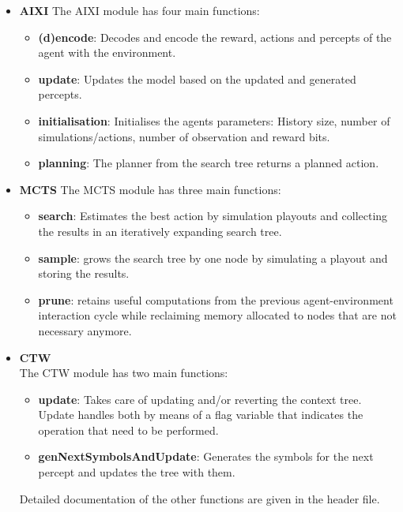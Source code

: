 \documentclass{article}
\theoremstyle{definition}
\newtheorem{primary statistics}[definition]{Primary Statistics}
\newtheorem{auxiliary statistics}[definition]{Auxiliary Statistics}
\begin{document}

\begin{itemize}
    \item \textbf{AIXI} The AIXI module has four main functions: 
    \begin{itemize}
        \item \textbf{(d)encode}: Decodes and encode the reward, actions and percepts of the agent with the environment.
        \item \textbf{update}: Updates the model based on the updated and generated percepts.
        \item \textbf{initialisation}: Initialises the agents parameters: History size, number of simulations/actions, number of observation and reward bits.
        \item \textbf{planning}: The planner from the search tree returns a planned action.
    \end{itemize}
    \item \textbf{MCTS}     The MCTS module has three main functions:
	\begin{itemize}
        \item \textbf{search}: Estimates the best action by simulation playouts and collecting the results in an iteratively expanding search tree.
        \item \textbf{sample}: grows the search tree by one node by simulating a playout and storing the results.
        \item \textbf{prune}: retains useful computations from the previous agent-environment interaction cycle while reclaiming memory allocated to nodes that are not necessary anymore.
    \end{itemize} 
    \item \textbf{CTW}\\
    The CTW module has two main functions: 
    \begin{itemize}
        \item \textbf{update}: Takes care of updating and/or reverting the context tree. Update handles both by means of a flag variable that indicates the operation that need to be performed.
        \item \textbf{genNextSymbolsAndUpdate}: Generates the symbols for the next percept and updates the tree with them.
    \end{itemize}
    Detailed documentation of the other functions are given in the header file.\\


\end{itemize}
\end{document}
